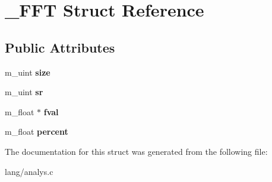 \hypertarget{struct__FFT}{}\section{\+\_\+\+F\+FT Struct Reference}
\label{struct__FFT}
\subsection*{Public Attributes}
\begin{DoxyCompactItemize}
\item 
\hypertarget{struct__FFT_a4fbb68b9f4e5dd0c2f8a12dbd50869ce}{}\label{struct__FFT_a4fbb68b9f4e5dd0c2f8a12dbd50869ce} 
m\+\_\+uint {\bfseries size}
\item 
\hypertarget{struct__FFT_a8b76d8451f45e30b0f7fffbe133af9d8}{}\label{struct__FFT_a8b76d8451f45e30b0f7fffbe133af9d8} 
m\+\_\+uint {\bfseries sr}
\item 
\hypertarget{struct__FFT_a28db6af82212c4e1bfa037a0c0952f69}{}\label{struct__FFT_a28db6af82212c4e1bfa037a0c0952f69} 
m\+\_\+float $\ast$ {\bfseries fval}
\item 
\hypertarget{struct__FFT_a087ac855024b69ebb526e867ca613485}{}\label{struct__FFT_a087ac855024b69ebb526e867ca613485} 
m\+\_\+float {\bfseries percent}
\end{DoxyCompactItemize}


The documentation for this struct was generated from the following file\+:\begin{DoxyCompactItemize}
\item 
lang/analys.\+c\end{DoxyCompactItemize}
